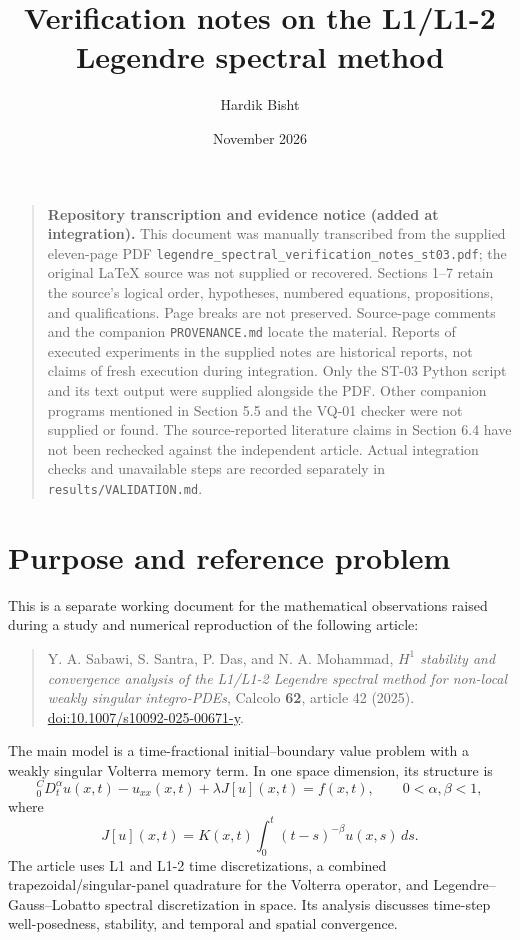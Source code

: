 \documentclass[11pt]{amsart}
\title{Verification notes on the L1/L1-2\texorpdfstring{\\}{ }Legendre spectral method}
\author{Hardik Bisht}
\date{November 2026}
\numberwithin{equation}{section}
\theoremstyle{remark}
\newcommand{\Caputo}{{}^{C}_{0}D_t^\alpha}
\begin{document}
\maketitle

\begin{quote}
\small\textbf{Repository transcription and evidence notice (added at integration).}
This document was manually transcribed from the supplied eleven-page PDF
\texttt{legendre\_spectral\_verification\_notes\_st03.pdf}; the original
\LaTeX{} source was not supplied or recovered. Sections 1--7 retain the
source's logical order, hypotheses, numbered equations, propositions, and
qualifications. Page breaks are not preserved. Source-page comments and the
companion \texttt{PROVENANCE.md} locate the material.
Reports of executed experiments in the supplied notes are historical reports,
not claims of fresh execution during integration. Only the ST-03 Python script
and its text output were supplied alongside the PDF. Other companion programs
mentioned in Section 5.5 and the VQ-01 checker were not supplied or found.
The source-reported literature claims in Section 6.4 have not been rechecked
against the independent article. Actual integration checks and unavailable
steps are recorded separately in \texttt{results/VALIDATION.md}.
\end{quote}

\section{Purpose and reference problem}
This is a separate working document for the mathematical observations raised
during a study and numerical reproduction of the following article:
\begin{quote}
Y. A. Sabawi, S. Santra, P. Das, and N. A. Mohammad,
\emph{$H^1$ stability and convergence analysis of the L1/L1-2 Legendre
spectral method for non-local weakly singular integro-PDEs},
Calcolo \textbf{62}, article 42 (2025).
\href{https://doi.org/10.1007/s10092-025-00671-y}{doi:10.1007/s10092-025-00671-y}.
\end{quote}
The main model is a time-fractional initial--boundary value problem with a
weakly singular Volterra memory term. In one space dimension, its structure is
\begin{equation}\label{eq:model}
\Caputo u(x,t)-u_{xx}(x,t)+\lambda J[u](x,t)=f(x,t),
\qquad 0<\alpha,\beta<1,
\end{equation}
where
\begin{equation}\label{eq:memory}
J[u](x,t)=K(x,t)\int_0^t(t-s)^{-\beta}u(x,s)\,ds.
\end{equation}
The article uses L1 and L1-2 time discretizations, a combined
trapezoidal/singular-panel quadrature for the Volterra operator, and
Legendre--Gauss--Lobatto spectral discretization in space. Its analysis
discusses time-step well-posedness, stability, and temporal and spatial
convergence.
\end{document}

